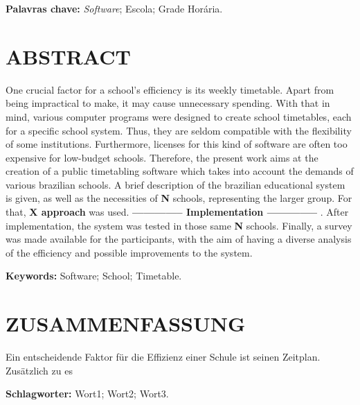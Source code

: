 \documentclass[12pt,a4paper]{article}
\begin{document}
	\begingroup
		\setlength{\parindent}{0mm}
		\textbf{Palavras chave:} \textit{Software}; Escola; Grade Horária.
	\endgroup
	\newpage


	\thispagestyle{empty}
	\section*{ABSTRACT}

	One crucial factor for a school's efficiency is its weekly timetable. Apart from being impractical to make, it may cause unnecessary spending. With that in mind, various computer programs were designed to create school timetables, each for a specific school system. Thus, they are seldom compatible with the flexibility of some institutions. Furthermore, licenses for this kind of software are often too expensive for low-budget schools. Therefore, the present work aims at the creation of a public timetabling software which takes into account the demands of various brazilian schools. A brief description of the brazilian educational system is given, as well as the necessities of \textbf{N} schools, representing the larger group. For that, \textbf{X approach} was used.  \textbf{ -------------- Implementation -------------- }. After implementation, the system was tested in those same \textbf{N} schools. Finally, a survey was made available for the participants, with the aim of having a diverse analysis of the efficiency and possible improvements to the system.

	\begingroup
		\setlength{\parindent}{0mm}
		\textbf{Keywords:} Software; School; Timetable.
	\endgroup

	\newpage


	\thispagestyle{empty}
	\section*{ZUSAMMENFASSUNG}

	Ein entscheidende Faktor für die Effizienz einer Schule ist seinen Zeitplan. Zusätzlich zu es

	\lipsum[1]


	\begingroup
		\setlength{\parindent}{0mm}
		\textbf{Schlagworter:} Wort1; Wort2; Wort3.
	\endgroup

	\newpage

	\thispagestyle{empty}
\end{document}
